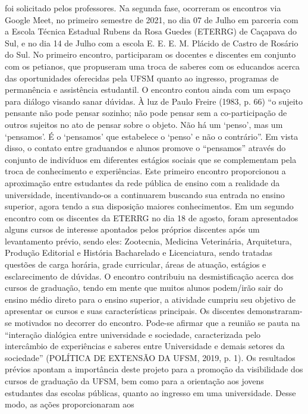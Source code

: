 foi solicitado pelos professores. Na segunda fase, ocorreram os encontros via Google Meet, no 
primeiro semestre de 2021, no dia 07 de Julho em parceria com a Escola Técnica Estadual Rubens 
da Rosa Guedes (ETERRG) de Caçapava do Sul, e no dia 14 de Julho com a escola E. E. E. M. 
Plácido de Castro de Rosário do Sul.
No primeiro encontro, participaram os docentes e discentes em conjunto com os petianos, que 
propuseram uma troca de saberes com os educandos acerca das oportunidades oferecidas pela 
UFSM quanto ao ingresso, programas de permanência e assistência estudantil. O encontro contou 
ainda com um espaço para diálogo visando sanar dúvidas. À luz de Paulo Freire (1983, p. 66) “o 
sujeito pensante não pode pensar sozinho; não pode pensar sem a co-participação de outros sujeitos 
no ato de pensar sobre o objeto. Não há um ‘penso’, mas um ‘pensamos’. É o ‘pensamos’ que 
estabelece o ‘penso’ e não o contrário”. Em vista disso, o contato entre graduandos e alunos 
promove o “pensamos” através do conjunto de indivíduos em diferentes estágios sociais que se 
complementam pela troca de conhecimento e experiências. Este primeiro encontro proporcionou 
a aproximação entre estudantes da rede pública de ensino com a realidade da universidade, 
incentivando-os a continuarem buscando sua entrada no ensino superior, agora tendo a sua 
disposição maiores conhecimentos.
Em um segundo encontro com os discentes da ETERRG no dia 18 de agosto, foram apresentados 
alguns cursos de interesse apontados pelos próprios discentes após um levantamento prévio, sendo 
eles: Zootecnia, Medicina Veterinária, Arquitetura, Produção Editorial e História Bacharelado e 
Licenciatura, sendo tratadas questões de carga horária, grade curricular, áreas de atuação, estágios 
e esclarecimento de dúvidas. O encontro contribuiu na desmistificação acerca dos cursos de 
graduação, tendo em mente que muitos alunos podem/irão sair do ensino médio direto para o 
ensino superior, a atividade cumpriu seu objetivo de apresentar os cursos e suas características 
principais. Os discentes demonstraram-se motivados no decorrer do encontro. Pode-se afirmar que 
a reunião se pauta na “interação dialógica entre universidade e sociedade, caracterizada pelo 
intercâmbio de experiências e saberes entre Universidade e demais setores da sociedade” 
(POLÍTICA DE EXTENSÃO DA UFSM, 2019, p. 1).
Os resultados prévios apontam a importância deste projeto para a promoção da visibilidade dos 
cursos de graduação da UFSM, bem como para a orientação aos jovens estudantes das escolas 
públicas, quanto ao ingresso em uma universidade. Desse modo, as ações proporcionaram aos 
